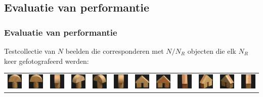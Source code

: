 \documentclass[dutch]{beamer}
\theoremstyle{definition}
\theoremstyle{remark}
\theoremstyle{example}
\begin{document}
\subsection{Evaluatie van performantie}
\frame
{
  \frametitle{Evaluatie van performantie}

  Testcollectie van $N$ beelden die corresponderen met 
  $N/N_R$ objecten die elk $N_R$ keer gefotografeerd werden:

\begin{center}

\begin{tabular}{c@{\ }c@{}c@{}c@{}c@{}c c@{\ }c@{}c@{}c@{}c@{}c}

\includegraphics[width=0.8cm]{coil/beeld-0.eps} &
\includegraphics[width=0.8cm]{coil/beeld-1.eps} &
\includegraphics[width=0.8cm]{coil/beeld-2.eps} &
\includegraphics[width=0.8cm]{coil/beeld-3.eps} &
\includegraphics[width=0.8cm]{coil/beeld-4.eps} &
\includegraphics[width=0.8cm]{coil/beeld-5.eps} &

\includegraphics[width=0.8cm]{coil/beeld-42.eps} &
\includegraphics[width=0.8cm]{coil/beeld-43.eps} &
\includegraphics[width=0.8cm]{coil/beeld-44.eps} &
\includegraphics[width=0.8cm]{coil/beeld-45.eps} &
\includegraphics[width=0.8cm]{coil/beeld-46.eps} &
\includegraphics[width=0.8cm]{coil/beeld-47.eps} \\


\end{tabular}
\end{center}}
\end{document}
